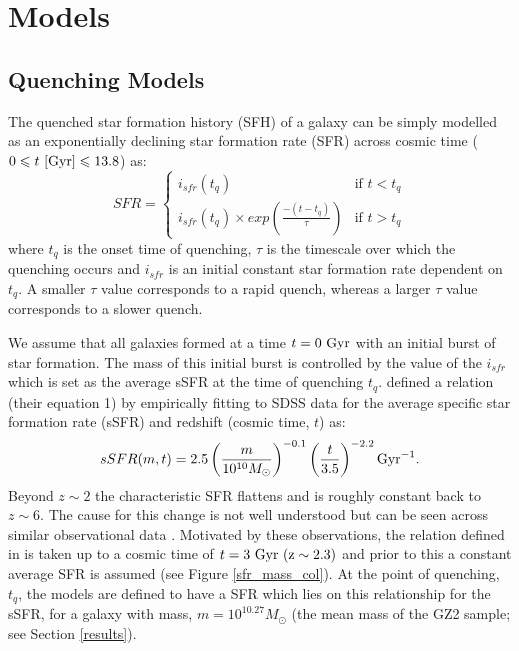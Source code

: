 \documentclass[useAMS,usenatbib]{mn2e}
\def\changed    {\color{titlecol} }
\begin{document}
\section{Models}\label{models}
\subsection{Quenching Models}\label{sfh}

The quenched star formation history (SFH) of a galaxy can be simply modelled as an exponentially declining star formation rate (SFR) across cosmic time ($0 \leq t ~\rm{[Gyr]} \leq 13.8$) as:
\begin{equation}\label{sfh}
SFR =
\begin{cases}
i_{sfr}(t_q) & \text{if } t < t_q \\
i_{sfr}(t_q) \times exp{\left( \frac{-(t-t_{q})}{\tau}\right)} & \text{if } t > t_q 
\end{cases}
\end{equation}
where $t_{q}$ is the onset time of quenching, $\tau$ is the timescale over which the quenching occurs and $i_{sfr}$ is an initial constant star formation rate dependent on $t_q$.  A smaller $\tau$ value corresponds to a rapid quench, whereas a larger $\tau$ value corresponds to a slower quench. 

We assume that all galaxies formed at a time $t=0~\rm{Gyr}$ with an initial burst of star formation. The mass of this initial burst is controlled by the value of the $i_{sfr}$ which is set as the average sSFR at the time of quenching $t_q$. \citet{Peng} defined a relation (their equation 1) by {\changed empirically fitting to SDSS data for the average specific star formation rate (sSFR) and redshift (cosmic time, $t$)} as:
\begin{equation}
sSFR(m,t) = 2.5 \left( \frac{m}{10^{10} M_{\odot}} \right)^{-0.1} \left(\frac{t}{3.5}\right)^{-2.2} \rm{Gyr}^{-1}.
\end{equation}
Beyond $z \sim 2$ the characteristic SFR flattens and is roughly constant back to $z\sim6$. The cause for this change is not well understood but can be seen across similar observational data \citep{Peng, Gonzalez, Beth}. Motivated by these observations, the relation defined in \citet{Peng} is taken up to a cosmic time of $t=3~\rm{Gyr}~(z \sim 2.3)$ and prior to this a constant average SFR is assumed (see Figure \ref{sfr_mass_col}). At the point of quenching, $t_{q}$, the models are defined to have a SFR which lies on this relationship for the sSFR, for a galaxy with mass, $m = 10^{10.27} M_{\odot}$ (the mean mass of the GZ2 sample; see Section \ref{results}).
 
\end{document}
